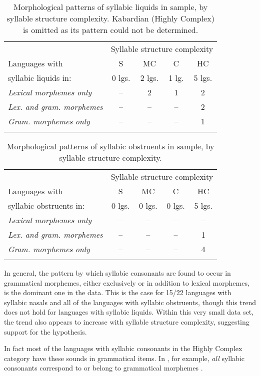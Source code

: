 \begin{table}
\begin{tabular}{lcccc}
\lsptoprule
 & \multicolumn{4}{c}{Syllable structure complexity}\\\cmidrule(lr){2-5}
Languages with & S & MC & C & HC\\
syllabic liquids in: & 0 lgs. & 2 lgs. & 1 lg. & 5 lgs.\\\midrule
 \textit{Lexical morphemes only} & -- & 2 & 1 & 2\\
 \textit{Lex. and gram. morphemes} & -- & -- & -- & 2\\
\textit{Gram. morphemes only} & -- & -- & -- & 1\\
\lspbottomrule
\end{tabular}
\caption{\label{tab:3.10}Morphological patterns of syllabic liquids in sample, by syllable structure complexity. Kabardian (Highly Complex) is omitted as its pattern could not be determined.}
\end{table}


\begin{table}
\begin{tabular}{lcccc}
\lsptoprule
 & \multicolumn{4}{c}{Syllable structure complexity}\\\cmidrule(lr){2-5}
Languages with & S & MC & C & HC\\
syllabic obstruents in: & 0 lgs. & 0 lgs. & 0 lgs. & 5 lgs.\\\midrule
 \textit{Lexical morphemes only} & -- & -- & -- & --\\
 \textit{Lex. and gram. morphemes} & -- & -- & -- & 1\\
 \textit{Gram. morphemes only} & -- & -- & -- & 4\\
\lspbottomrule
\end{tabular}
\caption{\label{tab:3.11}Morphological patterns of syllabic obstruents in sample, by syllable structure complexity.}
\end{table}

  In general, the pattern by which syllabic consonants are found to occur in grammatical morphemes, either exclusively or in addition to lexical morphemes, is the dominant one in the data. This is the case for 15/22 languages with syllabic nasals and all of the languages with syllabic obstruents, though this trend does not hold for languages with syllabic liquids. Within this very small data set, the trend also appears to increase with syllable structure complexity, suggesting support for the hypothesis. 

  In fact most of the languages with syllabic consonants in the Highly Complex category have these sounds in grammatical items. In , for example, \textit{all} syllabic consonants correspond to or belong to grammatical morphemes .

